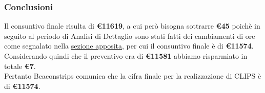 \subsubsection{Conclusioni}
Il consuntivo finale risulta di \textbf{\euro11619}, a cui però bisogna sottrarre \textbf{\euro45} poichè in seguito al periodo di Analisi di Dettaglio sono stati fatti dei cambiamenti di ore come segnalato nella \hyperref[consuntivoAD]{sezione apposita}, per cui il consuntivo finale è di \textbf{\euro11574}.
Considerando quindi che il preventivo era di \textbf{\euro11581} abbiamo risparmiato in totale \textbf{\euro7}.\\
Pertanto Beaconstrips comunica che la cifra finale per la realizzazione di CLIPS è di \textbf{\euro11574}.
